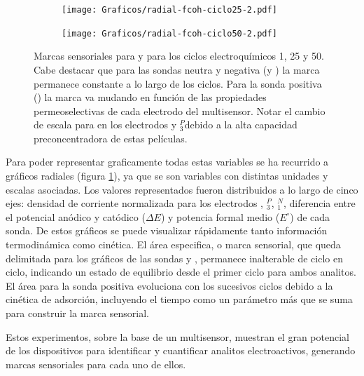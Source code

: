 \begin{figure}[b!]
\begin{subfigure}[t]{0.325\textwidth}
			     		\end{subfigure}
		     		\begin{subfigure}[t]{0.325\textwidth}
			        	\texttt{[image: Graficos/radial-fcoh-ciclo25-2.pdf]}
			     		\end{subfigure}
		     		\begin{subfigure}[t]{0.325\textwidth}
			        	\texttt{[image: Graficos/radial-fcoh-ciclo50-2.pdf]}
			     		\end{subfigure}	
			     	\caption{Marcas sensoriales para \ru\space \fe\space y \fc\space para los ciclos electroquímicos 1, 25 y 50. Cabe destacar que para las sondas neutra y negativa (\fc\space y \fe) la marca permanece constante a lo largo de los ciclos. Para la sonda positiva (\ru) la marca va mudando en función de las propiedades permeoselectivas de cada electrodo del multisensor. Notar el cambio de escala para \ru\space en los electrodos \pdmZ\space y \pdmZ$^P_3$\space debido a la alta capacidad preconcentradora de estas películas.} 
		     		\label{fig:radiales}
		      	   	\end{figure}
		 Para poder representar graficamente todas estas variables se ha recurrido a gráficos radiales (figura \ref{fig:radiales}), ya que se son variables con distintas unidades y escalas asociadas. Los valores representados fueron distribuidos a lo largo de cinco ejes: densidad de corriente normalizada para los electrodos \pdmZ, \pdmZ$^P_3$, \pdmZ$^N_1$, diferencia entre el potencial anódico y catódico ($\Delta E$) y potencia formal medio ($E^{\circ}$) de cada sonda. De estos gráficos se puede visualizar rápidamente tanto información termodinámica como cinética. El área especifica, o marca sensorial, que queda delimitada para los gráficos de las sondas \fc\space y \fe, permanece inalterable de ciclo en ciclo, indicando un estado de equilibrio desde el primer ciclo para ambos analitos. El área para la sonda positiva evoluciona con los sucesivos ciclos debido a la cinética de adsorción, incluyendo el tiempo como un parámetro más que se suma para construir la marca sensorial. 

		 Estos experimentos, sobre la base de un multisensor, muestran el gran potencial de los dispositivos para identificar y cuantificar analitos electroactivos, generando marcas sensoriales para cada uno de ellos. 
					     
